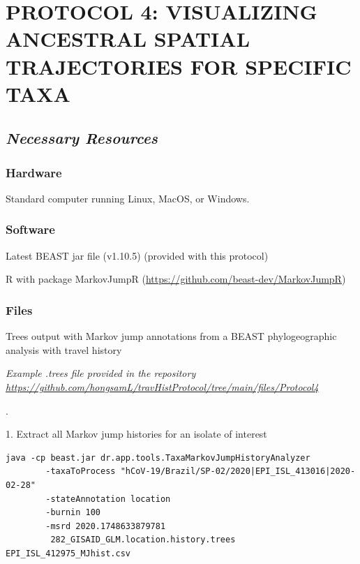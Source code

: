 \documentclass{article}
\newcommand{\ann}[1]{
\begin{adjustwidth}{0.5cm}{}
\it{#1}\\
\end{adjustwidth}}
\begin{document}
\section*{PROTOCOL 4: VISUALIZING ANCESTRAL SPATIAL TRAJECTORIES FOR SPECIFIC TAXA}
\subsection*{\textbf{\textit{Necessary Resources}}}
\subsubsection*{Hardware}
Standard computer running Linux, MacOS, or Windows.

\subsubsection*{Software}

\hspace{0.5cm}Latest BEAST jar file (v1.10.5) (provided with this protocol)

\hspace{0.5cm}R with package MarkovJumpR (\url{https://github.com/beast-dev/MarkovJumpR})

\subsubsection*{Files}
Trees output with Markov jump annotations from a BEAST phylogeographic analysis with travel history\\

\ann{Example .trees file provided in the repository\\ 
{\upshape\url{https://github.com/hongsamL/travHistProtocol/tree/main/files/Protocol4}}}.

1. Extract all Markov jump histories for an isolate of interest
\begin{verbatim}
java -cp beast.jar dr.app.tools.TaxaMarkovJumpHistoryAnalyzer
        -taxaToProcess "hCoV-19/Brazil/SP-02/2020|EPI_ISL_413016|2020-02-28"
        -stateAnnotation location
        -burnin 100
        -msrd 2020.1748633879781
         282_GISAID_GLM.location.history.trees EPI_ISL_412975_MJhist.csv
\end{verbatim}
\end{document}
